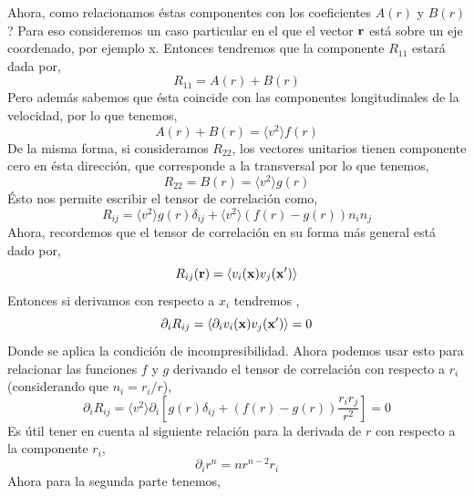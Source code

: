 \documentclass[executivepaper,12pt]{article}
\numberwithin{equation}{section}
\begin{document}
Ahora, como relacionamos éstas componentes con los coeficientes $A(r)$ y $B(r)$? Para eso consideremos un caso particular en el que el vector $\vb{r}$ está sobre un eje coordenado, por ejemplo x. Entonces tendremos que la componente $R_{11}$ estará dada por,
\begin{equation*}
	R_{11}=A(r)+B(r)
\end{equation*}
Pero además sabemos que ésta coincide con las componentes longitudinales de la velocidad, por lo que tenemos,
\begin{equation*}
	A(r)+B(r)=\langle v^2 \rangle f(r)
\end{equation*}
De la misma forma, si consideramos $R_{22}$, los vectores unitarios tienen componente cero en ésta dirección, que corresponde a la transversal por lo que tenemos,
\begin{equation*}
	R_{22}=B(r)=\langle v^2 \rangle g(r)
\end{equation*}
Ésto nos permite escribir el tensor de correlación como,
\begin{equation}
	R_{ij}=\langle v^2 \rangle g(r) \delta_{ij}+\langle v^2 \rangle(f(r)- g(r))n_in_j
	\label{eq-corr2}
\end{equation}
Ahora, recordemos que el tensor de correlación en su forma más general está dado por,
\begin{equation*}
	R_{ij}(\vb{r})=\langle v_i(\vb{x})v_j(\vb{x}') \rangle
\end{equation*}
Entonces si derivamos con respecto a $x_i$ tendremos \parencite{karman1938},
\begin{equation*}
	\partial_{i} R_{ij}=\langle \partial_i v_i(\vb{x})v_j(\vb{x}') \rangle=0
\end{equation*}
Donde se aplica la condición de incompresibilidad. Ahora podemos usar esto para relacionar las funciones $f$ y $g$ derivando el tensor de correlación con respecto a $r_{i}$ (considerando que $n_i=r_i/r$),
\begin{equation*}
	\partial_{i} R_{ij}=\langle v^2 \rangle\partial_i\left[ g(r) \delta_{ij}+(f(r)- g(r))\frac{r_i r_j}{r^2}\right]=0
\end{equation*}
Es útil tener en cuenta al siguiente relación para la derivada de $r$ con respecto a la componente $r_i$,
\begin{equation*}
	\partial_i r^n = n r^{n-2}r_i
\end{equation*}
Ahora para la segunda parte tenemos,
\end{document}
